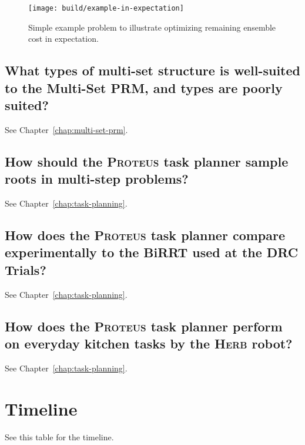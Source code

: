 {\begin{figure}
   \begin{center}
   \texttt{[image: build/example-in-expectation]}
   \end{center}
   \caption{Simple example problem to illustrate optimizing
      remaining ensemble cost in expectation.}
   \label{fig:example-in-expectation}
\end{figure}

\subsection{What types of multi-set structure is well-suited to
   the Multi-Set PRM, and types are poorly suited?}
\label{ques:multi-set-suited}

See Chapter~\ref{chap:multi-set-prm}.

\subsection{How should the \textsc{Proteus} task planner
   sample roots in multi-step problems?}
\label{ques:how-sequence}

See Chapter~\ref{chap:task-planning}.

\subsection{How does the \textsc{Proteus} task planner
   compare experimentally to the BiRRT used at the DRC Trials?}
\label{ques:drc-compare}

See Chapter~\ref{chap:task-planning}.

\subsection{How does the \textsc{Proteus} task planner
   perform on everyday kitchen tasks by the \textsc{Herb} robot?}
\label{ques:herb-performance}

See Chapter~\ref{chap:task-planning}.

}%

\section{Timeline}

See this table for the timeline.

